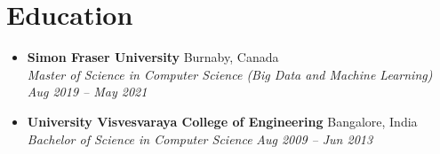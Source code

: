 \documentclass[10pt,a4paper]{article}
\begin{document}
\section{Education}

\begin{itemize}[leftmargin=*, itemsep=2pt, label=\textbullet]
  \item \textbf{Simon Fraser University} \hfill Burnaby, Canada \\
    \textit{Master of Science in Computer Science (Big Data and Machine Learning)} \hfill \textit{Aug 2019 -- May 2021}
  \item \textbf{University Visvesvaraya College of Engineering} \hfill Bangalore, India \\
    \textit{Bachelor of Science in Computer Science} \hfill \textit{Aug 2009 -- Jun 2013}
\end{itemize}
\end{document}
